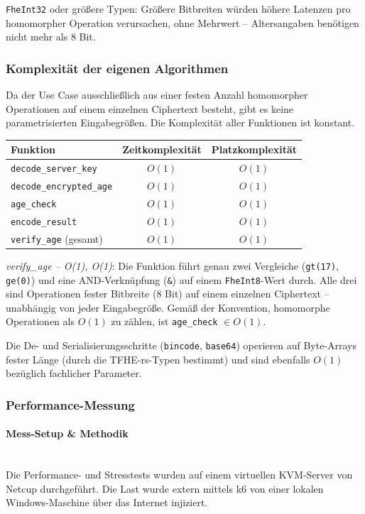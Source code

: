 \verb|FheInt32| oder größere Typen: Größere Bitbreiten würden höhere Latenzen pro homomorpher Operation verursachen, ohne Mehrwert -- Altersangaben benötigen nicht mehr als 8 Bit.

\subsubsection{Komplexität der eigenen Algorithmen}
Da der Use Case ausschließlich aus einer festen Anzahl homomorpher Operationen auf einem einzelnen Ciphertext besteht, gibt es keine parametrisierten Eingabegrößen. Die Komplexität aller Funktionen ist konstant.

\begin{table}[H]
\centering
\begin{tabular}{||l|c|c||}
    \hline
    \textbf{Funktion} & \textbf{Zeitkomplexität} & \textbf{Platzkomplexität} \\
    \hline\hline
    \verb|decode_server_key| & $O(1)$ & $O(1)$ \\
    \hline
    \verb|decode_encrypted_age| & $O(1)$ & $O(1)$ \\
    \hline
    \verb|age_check| & $O(1)$ & $O(1)$ \\
    \hline
    \verb|encode_result| & $O(1)$ & $O(1)$ \\
    \hline
    \verb|verify_age| (gesamt) & $O(1)$ & $O(1)$ \\
    \hline
\end{tabular}
\end{table}

\textit{verify\_age -- O(1), O(1)}: Die Funktion führt genau zwei Vergleiche (\verb|gt(17)|, \verb|ge(0)|) und eine AND-Verknüpfung (\verb|&|) auf einem \verb|FheInt8|-Wert durch. Alle drei sind Operationen fester Bitbreite (8 Bit) auf einem einzelnen Ciphertext -- unabhängig von jeder Eingabegröße. Gemäß der Konvention, homomorphe Operationen als $O(1)$ zu zählen, ist \verb|age_check| $\in O(1)$.

Die De- und Serialisierungsschritte (\verb|bincode|, \verb|base64|) operieren auf Byte-Arrays fester Länge (durch die TFHE-rs-Typen bestimmt) und sind ebenfalls $O(1)$ bezüglich fachlicher Parameter.

\subsubsection{Performance-Messung}

\paragraph{Mess-Setup \& Methodik}
\mbox{}\\
Die Performance- und Stresstests wurden auf einem virtuellen KVM-Server von Netcup durchgeführt. Die Last wurde extern mittels k6 von einer lokalen Windows-Maschine über das Internet injiziert.

